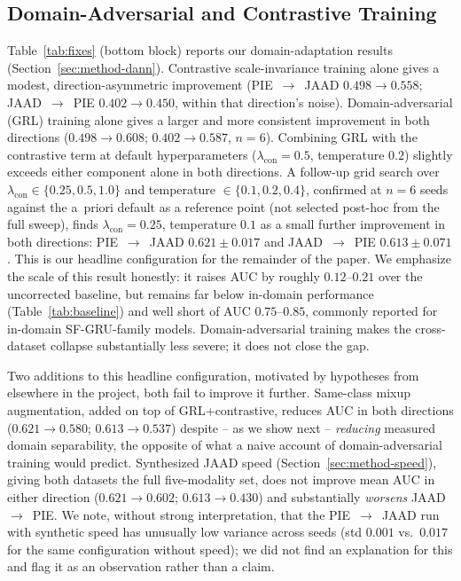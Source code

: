 \subsection{Domain-Adversarial and Contrastive Training}
\label{sec:results-dann}

Table~\ref{tab:fixes} (bottom block) reports our domain-adaptation
results (Section~\ref{sec:method-dann}). Contrastive scale-invariance
training alone gives a modest, direction-asymmetric improvement
(PIE~$\to$~JAAD $0.498\to0.558$; JAAD~$\to$~PIE $0.402\to0.450$, within
that direction's noise). Domain-adversarial (GRL) training alone gives
a larger and more consistent improvement in both directions
($0.498\to0.608$; $0.402\to0.587$, $n=6$). Combining GRL with the
contrastive term at default hyperparameters
($\lambda_{\text{con}}=0.5$, temperature $0.2$) slightly exceeds either
component alone in both directions. A follow-up grid search over
$\lambda_{\text{con}} \in \{0.25,0.5,1.0\}$ and temperature $\in
\{0.1,0.2,0.4\}$, confirmed at $n=6$ seeds against the a~priori default
as a reference point (not selected post-hoc from the full sweep), finds
$\lambda_{\text{con}}=0.25$, temperature $0.1$ as a small further
improvement in both directions: PIE~$\to$~JAAD $0.621\pm0.017$ and
JAAD~$\to$~PIE $0.613\pm0.071$. This is our headline configuration
for the remainder of the paper. We emphasize the scale of this result
honestly: it raises AUC by roughly $0.12$--$0.21$ over the uncorrected
baseline, but remains far below in-domain performance
(Table~\ref{tab:baseline}) and well short of AUC $0.75$--$0.85$,
commonly reported for in-domain SF-GRU-family models. Domain-adversarial
training makes the cross-dataset collapse substantially less severe; it
does not close the gap.

\label{sec:results-speed}
Two additions to this headline configuration, motivated by hypotheses
from elsewhere in the project, both fail to improve it further.
Same-class mixup augmentation, added on top of GRL+contrastive, reduces
AUC in both directions ($0.621\to0.580$; $0.613\to0.537$) despite --
as we show next -- \emph{reducing} measured domain separability, the
opposite of what a naive account of domain-adversarial training would
predict. Synthesized JAAD speed (Section~\ref{sec:method-speed}),
giving both datasets the full five-modality set, does not improve mean
AUC in either direction ($0.621\to0.602$; $0.613\to0.430$) and
substantially \emph{worsens} JAAD~$\to$~PIE. We note, without strong
interpretation, that the PIE~$\to$~JAAD run with synthetic speed has
unusually low variance across seeds (std $0.001$ vs.\ $0.017$ for the
same configuration without speed); we did not find an explanation for
this and flag it as an observation rather than a claim.

